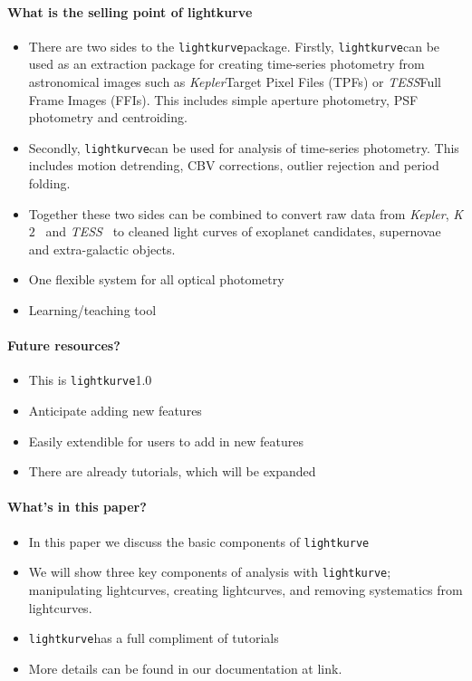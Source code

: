 \documentclass[twocolumn]{aastex62}
\newcommand{\ktwo}{{\it K$\mathit{2}$}}
\newcommand{\tess}{{\it TESS}}
\newcommand{\kepler}{{\it Kepler}}
\newcommand{\lightkurve}{\texttt{lightkurve}}
\begin{document}
\paragraph{What is the selling point of lightkurve}
\begin{itemize}
\item There are two sides to the \lightkurve package. Firstly, \lightkurve can be used as an extraction package for creating time-series photometry from astronomical images such as \kepler Target Pixel Files (TPFs) or \tess Full Frame Images (FFIs). This includes simple aperture photometry, PSF photometry and centroiding.
\item Secondly, \lightkurve can be used for analysis of time-series photometry. This includes motion detrending, CBV corrections, outlier rejection and period folding.
\item Together these two sides can be combined to convert raw data from \kepler, \ktwo~ and \tess~ to cleaned light curves of exoplanet candidates, supernovae and extra-galactic objects.
\item One flexible system for all optical photometry
\item Learning/teaching tool
\end{itemize}

\paragraph{Future resources?}
\begin{itemize}
\item This is \lightkurve 1.0
\item Anticipate adding new features
\item Easily extendible for users to add in new features
\item{There are already tutorials, which will be expanded}
\end{itemize}

\paragraph{What's in this paper?}
\begin{itemize}
\item In this paper we discuss the basic components of \lightkurve
\item We will show three key components of analysis with \lightkurve; manipulating lightcurves, creating lightcurves,
and removing systematics from lightcurves.
\item \lightkurve has a full compliment of tutorials
\item More details can be found in our documentation at link.
\end{itemize}
\end{document}
